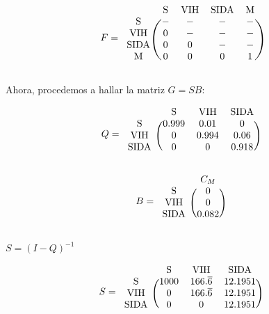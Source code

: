 \documentclass[11pt]{article}
\begin{document}
\begin{equation*}
  F = 
  \begin{blockarray}{ccccc}
     & \text{S} & \text{VIH} & \text{SIDA} & \text{M} \\
    \begin{block}{c(cccc)}
      \text{S}    & - & - & - & - \\
      \text{VIH}  & 0 & - & - & - \\
      \text{SIDA} & 0 & 0 & - & - \\
      \text{M}    & 0 & 0 & 0 & 1 \\
    \end{block}
  \end{blockarray}
\end{equation*}

Ahora, procedemos a hallar la matriz $ G = SB $:

\begin{equation*}
  Q = 
  \begin{blockarray}{cccc}
     & \text{S} & \text{VIH} & \text{SIDA} \\
    \begin{block}{c(ccc)}
      \text{S}    & 0.999 & 0.01  & 0 \\
      \text{VIH}  & 0     & 0.994 & 0.06 \\
      \text{SIDA} & 0     & 0     &  0.918   \\
    \end{block}
  \end{blockarray}
\end{equation*}

\begin{equation*}
  B = 
  \begin{blockarray}{cc}
     & C_M \\
    \begin{block}{c(c)}
      \text{S}    & 0 \\
      \text{VIH}  & 0 \\
      \text{SIDA} & 0.082   \\
    \end{block}
  \end{blockarray}
\end{equation*}

$ S = (I - Q)^{-1} $ 

\begin{equation*}
  S = 
  \begin{blockarray}{cccc}
     & \text{S} & \text{VIH} & \text{SIDA} \\
    \begin{block}{c(ccc)}
      \text{S}    & 1000 & 166.\overline{6} & 12.1951 \\
      \text{VIH}  & 0    & 166.\overline{6} & 12.1951 \\
      \text{SIDA} & 0    & 0                & 12.1951 \\
    \end{block}
  \end{blockarray}
\end{equation*}
\end{document}
